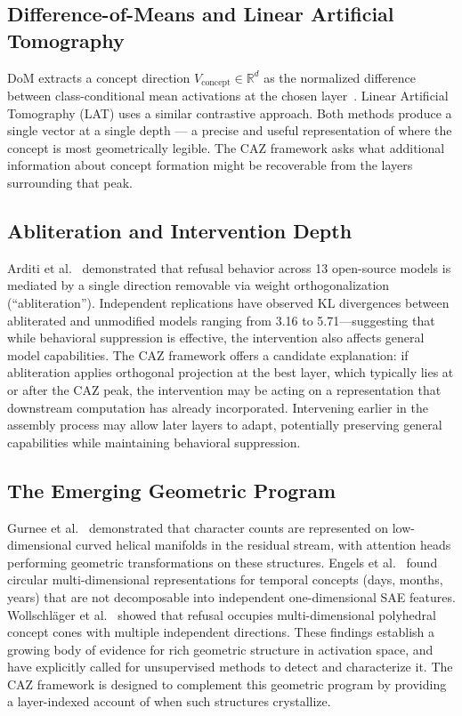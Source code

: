 \documentclass[11pt,a4paper]{article}
\begin{document}
\subsection{Difference-of-Means and Linear Artificial Tomography}

DoM extracts a concept direction $V_\text{concept} \in \mathbb{R}^d$ as the
normalized difference between class-conditional mean activations at the chosen
layer~\citep{zou2023representation}. Linear Artificial Tomography (LAT) uses a similar
contrastive approach. Both methods produce a single vector at a single depth --- a
precise and useful representation of where the concept is most geometrically legible.
The CAZ framework asks what additional information about concept formation might be
recoverable from the layers surrounding that peak.

\subsection{Abliteration and Intervention Depth}

Arditi et al.~\citep{arditi2024refusal} demonstrated that refusal behavior across
13 open-source models is mediated by a single direction removable via weight
orthogonalization (``abliteration''). Independent replications have observed KL
divergences between abliterated and unmodified models ranging from 3.16 to
5.71---suggesting that while behavioral suppression is effective, the intervention
also affects general model capabilities. The CAZ framework offers a candidate
explanation: if abliteration applies orthogonal projection at the best layer, which
typically lies at or after the CAZ peak, the intervention may be acting on a
representation that downstream computation has already incorporated. Intervening
earlier in the assembly process may allow later layers to adapt, potentially
preserving general capabilities while maintaining behavioral suppression.

\subsection{The Emerging Geometric Program}

Gurnee et al.~\citep{gurnee2025manifolds} demonstrated that character counts are
represented on low-dimensional curved helical manifolds in the residual stream,
with attention heads performing geometric transformations on these structures.
Engels et al.~\citep{engels2025linear} found circular multi-dimensional representations
for temporal concepts (days, months, years) that are not decomposable into independent
one-dimensional SAE features. Wollschläger et al.~\citep{wollschlager2025cones}
showed that refusal occupies multi-dimensional polyhedral concept cones with multiple
independent directions. These findings establish a growing body of evidence for rich
geometric structure in activation space, and have explicitly called for unsupervised
methods to detect and characterize it. The CAZ framework is designed to complement
this geometric program by providing a layer-indexed account of when such structures
crystallize.
\end{document}
